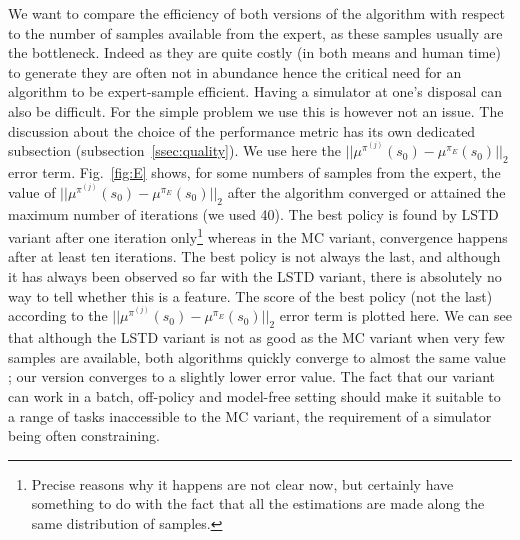 \documentclass{jfpda2011}
\begin{document}
We want to compare the efficiency of both versions of the algorithm with respect to the number of samples available from the expert, as these samples usually are the bottleneck. Indeed as they are quite costly (in both means and human time) to generate they are often not in abundance hence the critical need for an algorithm to be expert-sample efficient. Having a simulator at one's disposal can also be difficult. For the simple problem we use this is however not an issue. The discussion about the choice of the performance metric has its own dedicated subsection (subsection~\ref{ssec:quality}). We use here the $||\mu^{\pi^{(j)}}(s_0) - \mu^{\pi_E}(s_0)||_2$ error term. Fig.~\ref{fig:E} shows, for some numbers of samples from the expert, the value of $||\mu^{\pi^{(j)}}(s_0)-\mu^{\pi_E}(s_0)||_2$ after the algorithm converged or attained the maximum number of iterations (we used 40). The best policy is found by LSTD variant after one iteration only\footnote{Precise reasons why it happens are not clear now, but certainly have something to do with the fact that all the estimations are made along the same distribution of samples.} whereas in the MC variant, convergence happens after at least ten iterations. The best policy is not always the last, and although it has always been observed so far with the LSTD variant, there is absolutely no way to tell whether this is a feature. The score of the best policy (not the last) according to the $||\mu^{\pi^{(j)}}(s_0) - \mu^{\pi_E}(s_0)||_2$ error term is plotted here. We can see that although the LSTD variant is not as good as the MC variant when very few samples are available, both algorithms quickly converge to almost the same value ; our version converges to a slightly lower error value. The fact that our variant can work in a batch, off-policy and model-free setting should make it suitable to a range of tasks inaccessible to the MC variant, the requirement of a simulator being often constraining.
\end{document}
